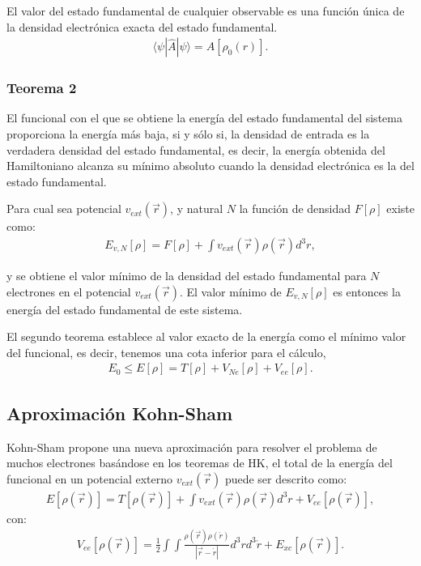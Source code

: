 El valor del estado fundamental de cualquier observable es una función única de
la densidad electrónica exacta del estado fundamental.
\begin{align}
  \langle \psi |\widehat{A}|\psi \rangle = A[\rho_0 (r)].
\end{align}

\subsubsection{Teorema 2}

El funcional con el que se obtiene la energía del estado fundamental del
sistema proporciona la energía más baja, si y sólo si, la densidad de entrada
es la verdadera densidad del estado fundamental, es decir, la energía obtenida
del Hamiltoniano alcanza su mínimo absoluto cuando la densidad electrónica es
la del estado fundamental.

Para cual sea potencial $v_{ext}(\vec{r})$, y natural $N$ la función de densidad
$F[\rho]$ existe como:
%
\begin{align}
  E_{v, N} [\rho] = F[\rho] + \int v_{ext}(\vec{r})\rho(\vec{r}) d^{3}r ,
\end{align}

\noindent y se obtiene el valor mínimo de la densidad del estado fundamental
para $N$ electrones en el potencial $v_{ext}(\vec{r})$. El valor mínimo de
$E_{v, N} [\rho]$ es entonces la energía del estado fundamental de este
sistema.

El segundo teorema establece al valor exacto de la energía como el mínimo valor
del funcional, es decir, tenemos una cota inferior para el cálculo,
%
\begin{align}
  E_{0}\leq E[\rho]=T[\rho] + V_{Ne}[\rho]+V_{ee}[\rho].
\end{align}

\subsection{Aproximación Kohn-Sham}

Kohn-Sham propone una nueva aproximación para resolver el problema de muchos
electrones basándose en los teoremas de HK, el total de la energía del
funcional en un potencial externo $v_{ext}(\vec{r})$ puede ser descrito como:
\begin{align}
  E[\rho(\vec{r})] = T[\rho(\vec{r})] + \int v_{ext}(\vec{r})\rho(\vec{r})d^{3}r +
  V_{ee}[\rho(\vec{r})] , 
  \label{KS1}
\end{align}
\noindent con:
\begin{align}
  V_{ee}[\rho(\vec{r})] = \frac12 \int\int \frac{\rho(\vec{r})\rho(\acute{r})}{|\vec{r}-\acute{r}|}d^{3}r
  d^{3}\acute{r} + {E}_{xc}[\rho(\vec{r})] .
\end{align}

